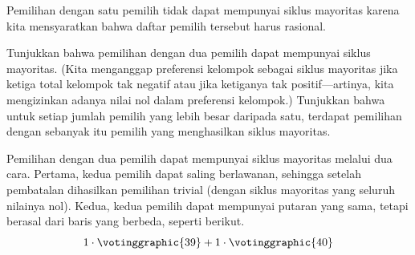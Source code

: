 \begin{exercises}
\begin{answer}
\begin{exparts}
      \end{exparts}
    \end{answer}
\item Pemilihan dengan satu pemilih tidak dapat mempunyai siklus mayoritas karena
    kita mensyaratkan bahwa daftar pemilih tersebut harus rasional.
    \begin{exparts}
      \partsitem Tunjukkan bahwa pemilihan dengan dua pemilih dapat mempunyai siklus mayoritas.
        (Kita menganggap preferensi kelompok sebagai siklus mayoritas jika ketiga
        total kelompok tak negatif atau jika ketiganya tak positif---artinya,
        kita mengizinkan adanya nilai nol dalam preferensi kelompok.)
      \partsitem Tunjukkan bahwa untuk setiap jumlah pemilih yang lebih besar daripada satu,
        terdapat pemilihan dengan sebanyak itu pemilih yang menghasilkan siklus
        mayoritas.
    \end{exparts}
    \begin{answer}
      \begin{exparts}
        \partsitem Pemilihan dengan dua pemilih dapat mempunyai siklus mayoritas melalui dua cara.
          Pertama, kedua pemilih dapat saling berlawanan,
          sehingga setelah pembatalan dihasilkan pemilihan trivial (dengan
          siklus mayoritas yang seluruh nilainya nol).
          Kedua, kedua pemilih dapat mempunyai putaran yang sama, tetapi berasal dari
          baris yang berbeda, seperti berikut.
          \begin{equation*}
            1\cdot \votinggraphic{39}
            +1\cdot\votinggraphic{40}

\end{equation*}
\end{exparts}
\end{answer}
\end{exercises}
